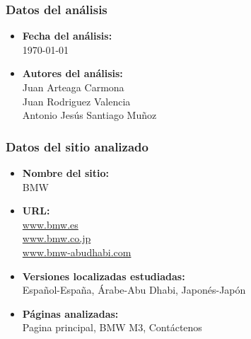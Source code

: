 \documentclass[a4paper,11pt]{article}
\begin{document}
\subsubsection{Datos del análisis}
\begin{itemize}
  \item \textbf{Fecha del análisis:}\\
  \today
  \item \textbf{Autores del análisis:}\\
      Juan Arteaga Carmona\\
      Juan Rodriguez Valencia\\
      Antonio Jesús Santiago Muñoz
\end{itemize}

\subsubsection{Datos del sitio analizado}
\begin{itemize}
\item \textbf{Nombre del sitio:}\\
BMW
\item \textbf{URL:}\\
\url{www.bmw.es}\\
\url{www.bmw.co.jp}\\
\url{www.bmw-abudhabi.com}
\item \textbf{Versiones localizadas estudiadas:}\\
Español-España, Árabe-Abu Dhabi, Japonés-Japón
\item \textbf{Páginas analizadas:}\\
Pagina principal, BMW M3, Contáctenos
\end{itemize}
\end{document}
